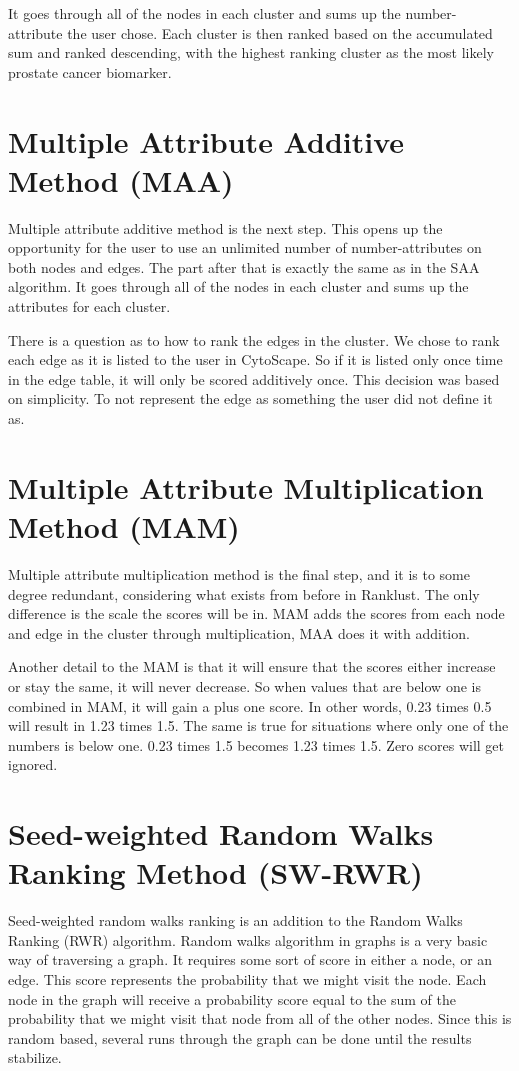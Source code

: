 It goes through all of the nodes in each cluster and sums up the number-
attribute the user chose. Each cluster is then ranked based on the accumulated
sum and ranked descending, with the highest ranking cluster as the most likely
prostate cancer biomarker.

\section{Multiple Attribute Additive Method (MAA)}
Multiple attribute additive method is the next step. This opens up the
opportunity for the user to use an unlimited number of number-attributes on both
nodes and edges. The part after that is exactly the same as in the SAA
algorithm. It goes through all of the nodes in each cluster and sums up the
attributes for each cluster.

There is a question as to how to rank the edges in the cluster. We chose to rank
each edge as it is listed to the user in CytoScape. So if it is listed only once
time in the edge table, it will only be scored additively once. This decision
was based on simplicity. To not represent the edge as something the user did not
define it as.

\section{Multiple Attribute Multiplication Method (MAM)}
Multiple attribute multiplication method is the final step, and it is to some
degree redundant, considering what exists from before in Ranklust. The only
difference is the scale the scores will be in. MAM adds the scores from each
node and edge in the cluster through multiplication, MAA does it with addition. 

Another detail to the MAM is that it will ensure that the scores either increase
or stay the same, it will never decrease. So when values that are below one is
combined in MAM, it will gain a plus one score. In other words, 0.23 times %
0.5 will result in 1.23 times 1.5. The same is true for situations where only
one of the numbers is below one. 0.23 times 1.5 becomes 1.23 times 1.5. Zero
scores will get ignored.

\section{Seed-weighted Random Walks Ranking Method (SW-RWR)}
Seed-weighted random walks ranking is an addition to the Random Walks Ranking
(RWR) algorithm. Random walks algorithm in graphs is a very basic way of
traversing a graph. It requires some sort of score in either a node, or an edge.
This score represents the probability that we might visit the node. Each node in
the graph will receive a probability score equal to the sum of the probability
that we might visit that node from all of the other nodes. Since this is random
based, several runs through the graph can be done until the results stabilize.

